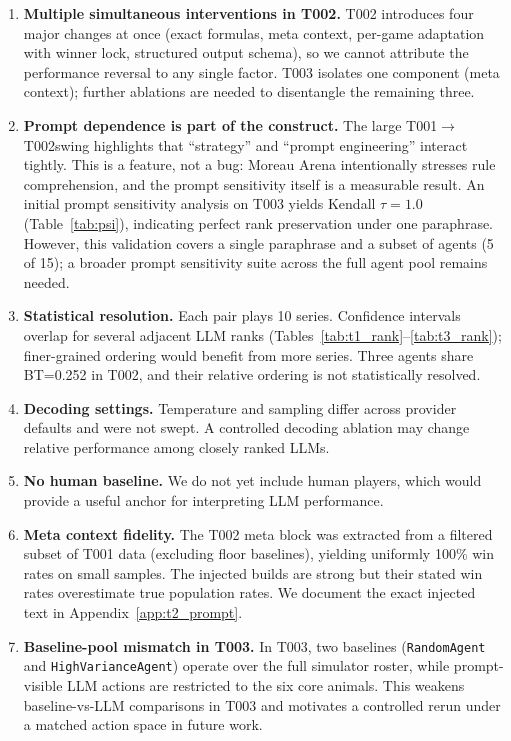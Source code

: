 \documentclass[11pt]{article}
\newcommand{\tOne}{T001}
\newcommand{\tTwo}{T002}
\newcommand{\tThree}{T003}
\begin{document}
\begin{enumerate}[leftmargin=*]
\item \textbf{Multiple simultaneous interventions in \tTwo.}
\tTwo{} introduces four major changes at once (exact formulas, meta context, per-game adaptation with winner lock, structured output schema), so we cannot attribute the performance reversal to any single factor.
\tThree{} isolates one component (meta context); further ablations are needed to disentangle the remaining three.

\item \textbf{Prompt dependence is part of the construct.}
The large \tOne$\to$\tTwo swing highlights that ``strategy'' and ``prompt engineering'' interact tightly.
This is a feature, not a bug: Moreau Arena intentionally stresses rule comprehension, and the prompt sensitivity itself is a measurable result.
An initial prompt sensitivity analysis on \tThree{} yields Kendall $\tau=1.0$ (Table~\ref{tab:psi}), indicating perfect rank preservation under one paraphrase.
However, this validation covers a single paraphrase and a subset of agents (5 of 15); a broader prompt sensitivity suite across the full agent pool remains needed.

\item \textbf{Statistical resolution.}
Each pair plays 10 series.
Confidence intervals overlap for several adjacent LLM ranks (Tables~\ref{tab:t1_rank}--\ref{tab:t3_rank}); finer-grained ordering would benefit from more series.
Three agents share BT=0.252 in \tTwo, and their relative ordering is not statistically resolved.

\item \textbf{Decoding settings.}
Temperature and sampling differ across provider defaults and were not swept.
A controlled decoding ablation may change relative performance among closely ranked LLMs.

\item \textbf{No human baseline.}
We do not yet include human players, which would provide a useful anchor for interpreting LLM performance.

\item \textbf{Meta context fidelity.}
The \tTwo{} meta block was extracted from a filtered subset of \tOne{} data (excluding floor baselines), yielding uniformly 100\% win rates on small samples.
The injected builds are strong but their stated win rates overestimate true population rates.
We document the exact injected text in Appendix~\ref{app:t2_prompt}.

\item \textbf{Baseline-pool mismatch in \tThree.}
In \tThree{}, two baselines (\texttt{RandomAgent} and \texttt{HighVarianceAgent}) operate over the full simulator roster, while prompt-visible LLM actions are restricted to the six core animals.
This weakens baseline-vs-LLM comparisons in \tThree{} and motivates a controlled rerun under a matched action space in future work.
\end{enumerate}
\end{document}
